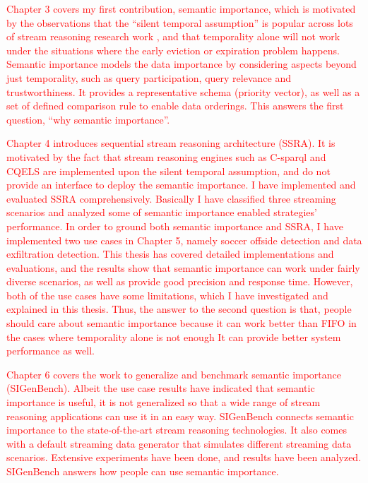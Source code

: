 \textcolor{red}{
Chapter 3 covers my first contribution, semantic importance, which is motivated by the observations that the ``silent temporal assumption'' is popular across lots of stream reasoning research work \cite{barbieri2010stream} \cite{stuckenschmidt2010towards} \cite{golab2003processing} \cite{barbieri2010deductive}, and that temporality alone will not work under the situations where the early eviction or expiration problem happens. 
Semantic importance models the data importance by considering aspects beyond just temporality, such as query participation, query relevance and trustworthiness. 
It provides a representative schema (priority vector), as well as a set of defined comparison rule to enable data orderings. 
This answers the first question, ``why semantic importance''.
}

\textcolor{red}{
Chapter 4 introduces sequential stream reasoning architecture (SSRA). 
It is motivated by the fact that stream reasoning engines such as C-sparql and CQELS are implemented upon the silent temporal assumption, and do not provide an interface to deploy the semantic importance. 
I have implemented and evaluated SSRA comprehensively.
Basically I have classified three streaming scenarios and analyzed some of semantic importance enabled strategies' performance. 
In order to ground both semantic importance and SSRA, I have implemented two use cases in Chapter 5, namely soccer offside detection and data exfiltration detection.
This thesis has covered detailed implementations and evaluations, and the results show that semantic importance can work under fairly diverse scenarios, as well as provide good precision and response time. 
However, both of the use cases have some limitations, which I have investigated and explained in this thesis. 
Thus, the answer to the second question is that, people should care about semantic importance because it can work better than FIFO in the cases where temporality alone is not enough
It can provide better system performance as well. 
}

\textcolor{red}{
Chapter 6 covers the work to generalize and benchmark semantic importance (SIGenBench).
Albeit the use case results have indicated that semantic importance is useful, it is not generalized so that a wide range of stream reasoning applications can use it in an easy way.
SIGenBench connects semantic importance to the state-of-the-art stream reasoning technologies.
It also comes with a default streaming data generator that simulates different streaming data scenarios. 
Extensive experiments have been done, and results have been analyzed. 
SIGenBench answers how people can use semantic importance.
}
%
